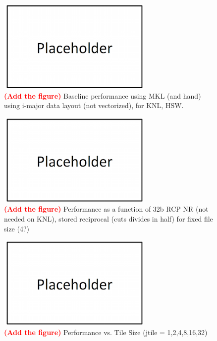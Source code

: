 \documentclass[conference]{IEEEtran}
\newcommand{\fix}[1]{{\bf \textcolor {red}{#1}}}
\begin{document}
\begin{figure}%
\centering
\includegraphics[width=0.9\columnwidth]{figures/placeholder.png}
\caption{\fix{(Add the figure)} 
Baseline performance using MKL (and hand) 
using i-major data layout (not vectorized), for KNL, HSW.}
\label{fig:tbd}
\end{figure}

\begin{figure}%
\centering
\includegraphics[width=0.9\columnwidth]{figures/placeholder.png}
\caption{\fix{(Add the figure)} 
Performance as a function of 32b RCP NR (not needed on KNL), stored
reciprocal (cuts divides in half) for fixed file size (4?) }
\end{figure}

\begin{figure}%
\centering
\includegraphics[width=0.9\columnwidth]{figures/placeholder.png}
\caption{\fix{(Add the figure)} 
Performance vs. Tile Size (jtile = 1,2,4,8,16,32) }
\end{figure}
\end{document}
